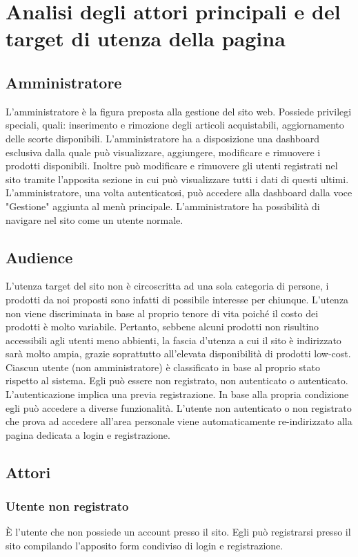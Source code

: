 \newpage
\section{Analisi degli attori principali e del target di utenza della pagina}

\subsection{Amministratore} L'amministratore è la figura preposta alla gestione del sito web. Possiede privilegi speciali, quali: inserimento e rimozione degli articoli acquistabili, aggiornamento delle scorte disponibili. L'amministratore ha a disposizione una dashboard esclusiva dalla quale può visualizzare, aggiungere, modificare e rimuovere i prodotti disponibili. Inoltre può modificare e rimuovere gli utenti registrati nel sito tramite l'apposita sezione in cui può visualizzare tutti i dati di questi ultimi. L'amministratore, una volta autenticatosi, può accedere alla dashboard dalla voce "Gestione" aggiunta al menù principale. L'amministratore ha possibilità di navigare nel sito come un utente normale.

\subsection{Audience} L'utenza target del sito non è circoscritta ad una sola categoria di persone, i prodotti da noi proposti sono infatti di possibile interesse per chiunque. L'utenza non viene discriminata in base al proprio tenore di vita poiché il costo dei prodotti è molto variabile. Pertanto, sebbene alcuni prodotti non risultino accessibili agli utenti meno abbienti, la fascia d'utenza a cui il sito è indirizzato sarà molto ampia, grazie soprattutto all'elevata disponibilità di prodotti low-cost.
Ciascun utente (non amministratore) è classificato in base al proprio stato rispetto al sistema. Egli può essere non registrato, non autenticato o autenticato. L'autenticazione implica una previa registrazione. In base alla propria condizione egli può accedere a diverse funzionalità. L'utente non autenticato o non registrato che prova ad accedere all'area personale viene automaticamente re-indirizzato alla pagina dedicata a login e registrazione.

\subsection{Attori}
\subsubsection{Utente non registrato} \`E l'utente che non possiede un account presso il sito. Egli può registrarsi presso il sito compilando l'apposito form condiviso di login e registrazione.

